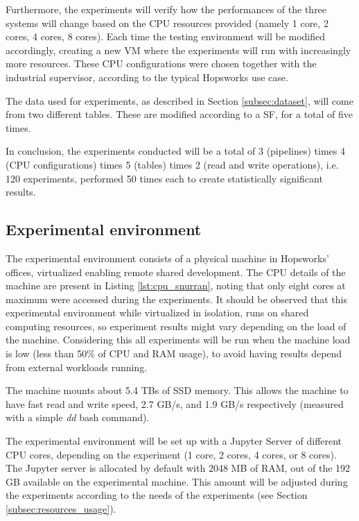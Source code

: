 Furthermore, the experiments will verify how the performances of the three systems will change based on the \gls{CPU} resources provided (namely 1 core, 2 cores, 4 cores, 8 cores). Each time the testing environment will be modified accordingly, creating a new \gls{VM} where the experiments will run with increasingly more resources. These \gls{CPU} configurations were chosen together with the industrial supervisor, according to the typical Hopsworks use case.

The data used for experiments, as described in Section \ref{subsec:dataset}, will come from two different tables. These are modified according to a \gls{SF}, for a total of five times.

In conclusion, the experiments conducted will be a total of 3 (pipelines) times 4 (\gls{CPU} configurations) times 5 (tables) times 2 (read and write operations), i.e. 120 experiments, performed 50 times each to create statistically significant results.

\subsection{Experimental environment}
\label{subsec:exp_env}

The experimental environment consists of a physical machine in Hopsworks' offices, virtualized enabling remote shared development. The \gls{CPU} details of the machine are present in Listing \ref{lst:cpu_snurran}, noting that only eight cores at maximum were accessed during the experiments. It should be observed that this experimental environment while virtualized in isolation, runs on shared computing resources, so experiment results might vary depending on the load of the machine. Considering this all experiments will be run when the machine load is low (less than 50\% of \gls{CPU} and \gls{RAM} usage), to avoid having results depend from external workloads running.

The machine mounts about 5.4 TBs of \gls{SSD} memory. This allows the machine to have fast read and write speed, 2.7 GB/s, and 1.9 GB/s respectively (measured with a simple \textit{dd} bash command). 

The experimental environment will be set up with a Jupyter Server of different CPU cores, depending on the experiment (1 core, 2 cores, 4 cores, or 8 cores). The Jupyter server is allocated by default with 2048 MB of \gls{RAM}, out of the 192 GB  available on the experimental machine. This amount will be adjusted during the experiments according to the needs of the experiments (see Section \ref{subsec:resources_usage}).

